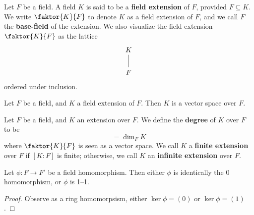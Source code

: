 \begin{definition}
  Let $F$ be a field. A field $K$ is said to be a \textbf{field
  extension} of $F$, provided  $F \subseteq K$. We write
  $\faktor{K}{F}$ to denote $K$ as a field extension of $F$, and we
  call $F$ the \textbf{base-field} of the extension. We also
  visualize the field extension $\faktor{K}{F}$ as the lattice
  \[\begin{tikzcd}
    K \\
    F
    \arrow[no head, from=2-1, to=1-1]
  \end{tikzcd}\]
  ordered under inclusion.
\end{definition}

\begin{proposition}\label{proposition_8.1.3}
  Let $F$ be a field, and  $K$ a field extension of  $F$. Then  $K$ is
  a vector space over $F$.
\end{proposition}

\begin{definition}
  Let $F$ be a field, and $K$ an extension over $F$. We define the
   \textbf{degree} of $K$ over  $F$ to be
   \begin{equation*}
     [K:F]=\dim_F{K}
   \end{equation*}
   where $\faktor{K}{F}$ is seen as a vector space. We call $K$ a
   \textbf{finite extension} over $F$ if  $[K:F]$ is finite;
   otherwise, we call $K$ an \textbf{infinite extension} over $F$.
\end{definition}

\begin{proposition}\label{proposition_8.1.4}
  Let $\phi:F \xrightarrow{} F'$ be a field homomorphism. Then either
  $\phi$ is identically the  $0$ homomorphism, or  $\phi$ is 1--1.
\end{proposition}
\begin{proof}
  Observe as a ring homomorpsism, either $\ker{\phi}=(0)$ or
  $\ker{\phi}=(1)$.
\end{proof}


